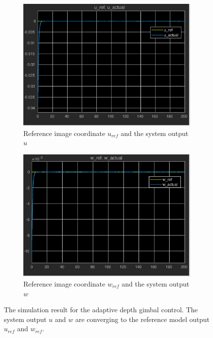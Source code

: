 \begin{figure}[htbp]
	\centering
	\begin{subfigure}{0.5\textwidth}
		\centering
		\includegraphics[width=0.9\linewidth]{images/chapter2/u_adaptive}
		\caption{Reference image coordinate $u_{ref}$ and the system output $u$}
	\end{subfigure}%
	\begin{subfigure}{0.5\textwidth}
		\centering
		\includegraphics[width=0.9\linewidth]{images/chapter2/w_adaptive}
		\caption{Reference image coordinate $w_{ref}$ and the system output $w$}
	\end{subfigure}
	\caption[The simulation result for the adaptive depth gimbal control.]{The simulation result for the adaptive depth gimbal control. The system output $u$ and $w$ are converging to the reference model output $u_{ref}$ and $w_{ref}$.}
	\label{adaptive_result}
\end{figure}

